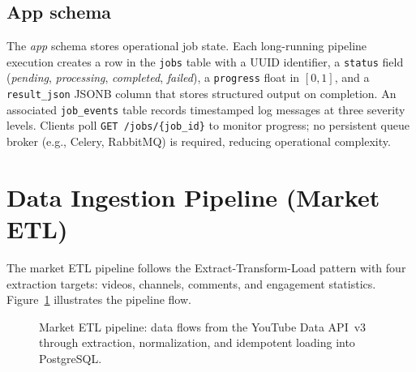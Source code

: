 \documentclass[ENG]{TFUOC}
\begin{document}
\subsection*{App schema}

The \textit{app} schema stores operational job state. Each long-running pipeline execution creates a row in the \texttt{jobs} table with a UUID identifier, a \texttt{status} field (\textit{pending}, \textit{processing}, \textit{completed}, \textit{failed}), a \texttt{progress} float in $[0,1]$, and a \texttt{result\_json} JSONB column that stores structured output on completion. An associated \texttt{job\_events} table records timestamped log messages at three severity levels. Clients poll \texttt{GET /jobs/\{job\_id\}} to monitor progress; no persistent queue broker (e.g., Celery, RabbitMQ) is required, reducing operational complexity.

\section{Data Ingestion Pipeline (Market ETL)}

The market ETL pipeline follows the Extract-Transform-Load pattern with four extraction targets: videos, channels, comments, and engagement statistics. Figure~\ref{fig:etl_pipeline} illustrates the pipeline flow.

\begin{figure}[H]
\centering
{}
\caption{Market ETL pipeline: data flows from the YouTube Data API~v3 through extraction, normalization, and idempotent loading into PostgreSQL.}
\label{fig:etl_pipeline}
\end{figure}
\end{document}
